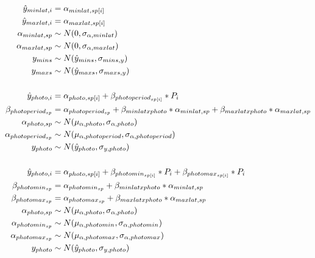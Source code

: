 \documentclass[11pt,letter]{article}
\begin{document}

\renewcommand{\refname}{\CHead{}}


\begin{align*}
\hat{y}_{minlat, i} &= \alpha_{minlat, sp[i]}\\
\hat{y}_{maxlat, i} &= \alpha_{maxlat, sp[i]}\\
\alpha_{minlat, sp} & \sim N(0, \sigma_{\alpha, minlat}) \\
\alpha_{maxlat, sp} & \sim N(0, \sigma_{\alpha, maxlat}) \\
y_{mins}& \sim N(\hat{y}_{mins},\sigma_{mins, y}) \\
y_{maxs}& \sim N(\hat{y}_{maxs},\sigma_{maxs, y}) \\
\vspace{1ex}\\
\hat{y}_{photo, i} &= \alpha_{photo, sp[i]} + \beta_{photoperiod_{sp[i]}}*P_i \\
\beta_{photoperiod_{sp}} & = \alpha_{photoperiod_{sp}} + \beta_{minlat x photo}*\alpha_{minlat,sp}  + \beta_{maxlat x photo}*\alpha_{maxlat,sp}\\
\alpha_{photo, sp} & \sim N(\mu_{\alpha, photo}, \sigma_{\alpha, photo}) \\
\alpha_{photoperiod_{sp}} & \sim N(\mu_{\alpha, photoperiod}, \sigma_{\alpha, photoperiod})\\
y_{photo} & \sim N(\hat{y}_{photo},\sigma_{y, photo}) \\
\vspace{1ex}\\
\hat{y}_{photo, i} &= \alpha_{photo, sp[i]} + \beta_{photomin_{sp[i]}}*P_i + \beta_{photomax_{sp[i]}}*P_i\\
\beta_{photomin_{sp}} & = \alpha_{photomin_{sp}} + \beta_{minlat x photo}*\alpha_{minlat,sp}\\
\beta_{photomax_{sp}} & = \alpha_{photomax_{sp}} + \beta_{maxlat x photo}*\alpha_{maxlat,sp}\\
\alpha_{photo, sp} & \sim N(\mu_{\alpha, photo}, \sigma_{\alpha, photo}) \\
\alpha_{photomin_{sp}} & \sim N(\mu_{\alpha, photomin}, \sigma_{\alpha, photomin})\\
\alpha_{photomax_{sp}} & \sim N(\mu_{\alpha, photomax}, \sigma_{\alpha, photomax})\\
y_{photo} & \sim N(\hat{y}_{photo},\sigma_{y, photo}) 
\end{align*}
\end{document}
